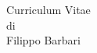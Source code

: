 \documentclass{article}
\begin{document}
	\begin{center}
		{\Large Curriculum Vitae}\\
		di\\
		{\Large Filippo Barbari}
	\end{center}
\end{document}
